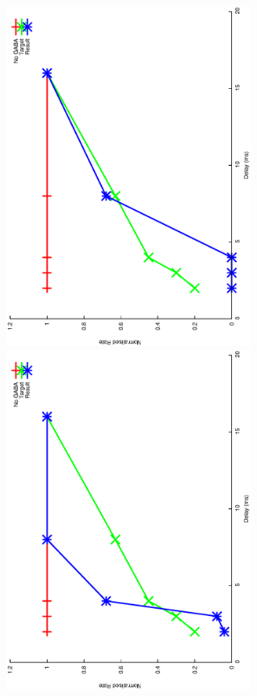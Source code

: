 \documentclass{article}
\begin{document}
\includegraphics[keepaspectratio=true,angle=-90,width=0.6\textwidth]{DS_ClickRecovery_result.35.eps}\clearpage
\includegraphics[keepaspectratio=true,angle=-90,width=0.6\textwidth]{DS_ClickRecovery_result.36.eps}\clearpage
\end{document}
